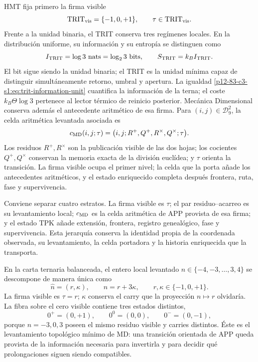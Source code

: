 HMT fija primero la firma visible
\begin{equation}
\mathrm{TRIT}_{\rm vis}=\{-1,0,+1\},
\qquad \tau\in\mathrm{TRIT}_{\rm vis}.
\label{p12-83-c3-s1:eq:trit-visible-signature}
\end{equation}
Frente a la unidad binaria, el TRIT conserva tres regímenes locales. En la
distribución uniforme, su información y su entropía se distinguen como
\begin{equation}
I_{\rm TRIT}=\log3\ \text{nats}=\log_2 3\ \text{bits},
\qquad S_{\rm TRIT}=k_BI_{\rm TRIT}.
\label{p12-83-c3-s1:eq:trit-information-unit}
\end{equation}
El bit sigue siendo la unidad binaria; el TRIT es la unidad mínima capaz de
distinguir simultáneamente retorno, umbral y apertura. La igualdad
\eqref{p12-83-c3-s1:eq:trit-information-unit} cuantifica la información de la terna; el
coste \(k_B\Theta\log3\) pertenece al lector térmico de reinicio posterior.
Mecánica Dimensional conserva además el antecedente aritmético de esa firma.
Para \((i,j)\in\mathcal D_9^2\), la celda aritmética levantada asociada es
\begin{equation}
c_{\rm MD}(i,j;\tau)=
\bigl(i,j;R^+,Q^+,R^\times,Q^\times;\tau\bigr).
\label{p12-83-c3-s1:eq:trit-complete-local-unit}
\end{equation}
Los residuos \(R^+,R^\times\) son la publicación visible de las dos hojas;
los cocientes \(Q^+,Q^\times\) conservan la memoria exacta de la división
euclídea; y \(\tau\) orienta la transición. La firma visible ocupa el primer
nivel; la celda que la porta añade los antecedentes aritméticos, y el estado
enriquecido completa después frontera, ruta, fase y supervivencia.

Conviene separar cuatro estratos. La firma visible es \(\tau\); el par
residuo--acarreo es su levantamiento local; \(c_{\rm MD}\) es la celda
aritmética de APP provista de esa firma; y el estado TPK añade extensión,
frontera, registro genealógico, fase y supervivencia. Esta jerarquía conserva la identidad
propia de la coordenada observada, su levantamiento, la celda portadora y la
historia enriquecida que la transporta.

En la carta ternaria balanceada, el entero local levantado
\(n\in\{-4,-3,\ldots,3,4\}\) se descompone de manera única como
\begin{equation}
\widehat n=(r,\kappa),
\qquad n=r+3\kappa,
\qquad r,\kappa\in\{-1,0,+1\}.
\label{p12-83-c3-s1:eq:trit-balanced-lift}
\end{equation}
La firma visible es \(\tau=r\); \(\kappa\) conserva el carry que la proyección
\(n\mapsto r\) olvidaría.
La fibra sobre el cero visible contiene tres estados distintos,
\[
0^+=(0,+1),\qquad 0^0=(0,0),\qquad 0^-=(0,-1),
\]
porque \(n=-3,0,3\) poseen el mismo residuo visible y carries distintos. Éste
es el levantamiento topológico mínimo de MD: una transición orientada de APP
queda provista de la información necesaria para invertirla y para decidir qué
prolongaciones siguen siendo compatibles.


